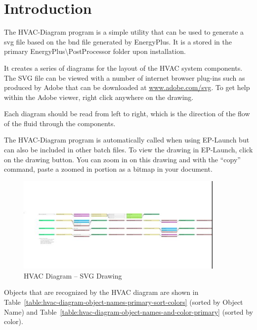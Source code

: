 \section{Introduction}\label{introduction-000}

The HVAC-Diagram program is a simple utility that can be used to generate a svg file based on the bnd file generated by EnergyPlus. It is a stored in the primary EnergyPlus\textbackslash{}PostProcessor folder upon installation.

It creates a series of diagrams for the layout of the HVAC system components. The SVG file can be viewed with a number of internet browser plug-ins such as produced by Adobe that can be downloaded at \href{http://www.adobe.com/svg}{www.adobe.com/svg}. To get help within the Adobe viewer, right click anywhere on the drawing.

Each diagram should be read from left to right, which is the direction of the flow of the fluid through the components.

The HVAC-Diagram program is automatically called when using EP-Launch but can also be included in other batch files. To view the drawing in EP-Launch, click on the drawing button. You can zoom in on this drawing and with the ``copy'' command, paste a zoomed in portion as a bitmap in your document.

\begin{figure}[hbtp] %
\centering
\includegraphics[width=0.9\textwidth, height=0.9\textheight, keepaspectratio=true]{media/image030.jpg}
\caption{HVAC Diagram -- SVG Drawing \protect \label{fig:hvac-diagram-svg-drawing}}
\end{figure}

Objects that are recognized by the HVAC diagram are shown in Table~\ref{table:hvac-diagram-object-names-primary-sort-colors} (sorted by Object Name) and Table~\ref{table:hvac-diagram-object-names-and-color-primary} (sorted by color).

